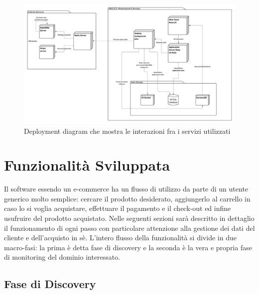 \documentclass[target=bach,aauheader=,style=]{thud}
\begin{document}
\begin{figure}[h]
\centering
\includegraphics[width=1\linewidth]{Deployment Diagram.png}
\caption{Deployment diagram che mostra le interazioni fra i servizi utilizzati}
\label{fig:dep_diagram}
\end{figure}

\chapter{Funzionalità Sviluppata}

Il software essendo un e-commerce ha un flusso di utilizzo da parte di un utente generico molto semplice: cercare il prodotto desiderato,
aggiungerlo al carrello in caso lo si voglia acquistare, effettuare il pagamento e il check-out ed infine usufruire del prodotto acquistato.
Nelle seguenti sezioni sarà descritto in dettaglio il funzionamento di ogni passo con particolare attenzione alla gestione dei dati del cliente e dell'acquisto in sè.
L'intero flusso della funzionalità si divide in due macro-fasi: la prima è detta fase di discovery e la seconda è la vera e propria fase di monitoring del dominio interessato.

\section{Fase di Discovery}
\end{document}
